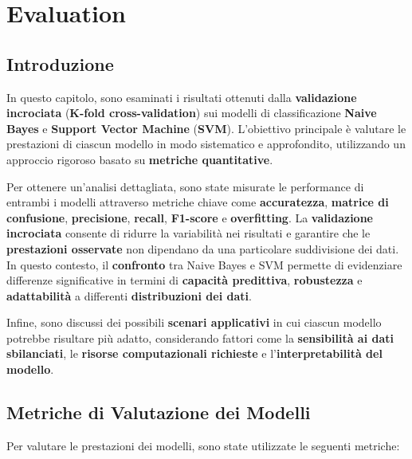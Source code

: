 \chapter{Evaluation}

\section{Introduzione}
In questo capitolo, sono esaminati i risultati ottenuti dalla \textbf{validazione incrociata} (\textbf{K-fold cross-validation}) sui modelli di classificazione \textbf{Naive Bayes} e \textbf{Support Vector Machine} (\textbf{SVM}). L'obiettivo principale è valutare le prestazioni di ciascun modello in modo sistematico e approfondito, utilizzando un approccio rigoroso basato su \textbf{metriche quantitative}.

Per ottenere un'analisi dettagliata, sono state misurate le performance di entrambi i modelli attraverso metriche chiave come \textbf{accuratezza}, \textbf{matrice di confusione}, \textbf{precisione}, \textbf{recall}, \textbf{F1-score} e \textbf{overfitting}. La \textbf{validazione incrociata} consente di ridurre la variabilità nei risultati e garantire che le \textbf{prestazioni osservate} non dipendano da una particolare suddivisione dei dati. In questo contesto, il \textbf{confronto} tra Naive Bayes e SVM permette di evidenziare differenze significative in termini di \textbf{capacità predittiva}, \textbf{robustezza} e \textbf{adattabilità} a differenti \textbf{distribuzioni dei dati}.

Infine, sono discussi dei possibili \textbf{scenari applicativi} in cui ciascun modello potrebbe risultare più adatto, considerando fattori come la \textbf{sensibilità ai dati sbilanciati}, le \textbf{risorse computazionali richieste} e l'\textbf{interpretabilità del modello}.



\section{Metriche di Valutazione dei Modelli}
Per valutare le prestazioni dei modelli, sono state utilizzate le seguenti metriche:

